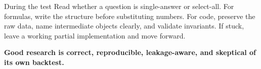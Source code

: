 \documentclass[10pt,a4paper]{article}
\begin{document}
\begin{keybox}{During the test}
Read whether a question is single-answer or select-all. For formulas, write the structure before substituting numbers. For code, preserve the raw data, name intermediate objects clearly, and validate invariants. If stuck, leave a working partial implementation and move forward.
\end{keybox}

\vfill
\begin{tcolorbox}[colback=navy,colframe=navy,arc=2mm,left=5mm,right=5mm,top=4mm,bottom=4mm]
\color{white}\centering
\Large\bfseries Good research is correct, reproducible, leakage-aware, and skeptical of its own backtest.
\end{tcolorbox}
\end{document}
